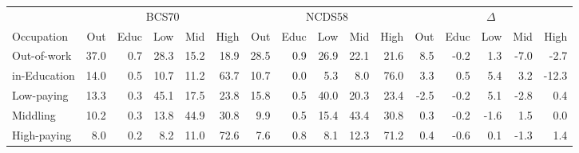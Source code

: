 
\begin{tabular}{lrrrrrrrrrrrrrrr}
\toprule
\multicolumn{1}{c}{} & \multicolumn{5}{c}{BCS70} & \multicolumn{5}{c}{NCDS58} & \multicolumn{5}{c}{$\Delta$} \\
\cmidrule(l{3pt}r{3pt}){2-6} \cmidrule(l{3pt}r{3pt}){7-11} \cmidrule(l{3pt}r{3pt}){12-16}
Occupation & Out & Educ & Low & Mid & High & Out & Educ & Low & Mid & High & Out & Educ & Low & Mid & High\\
\midrule
Out-of-work & 37.0 & 0.7 & 28.3 & 15.2 & 18.9 & 28.5 & 0.9 & 26.9 & 22.1 & 21.6 & 8.5 & -0.2 & 1.3 & -7.0 & -2.7\\
in-Education & 14.0 & 0.5 & 10.7 & 11.2 & 63.7 & 10.7 & 0.0 & 5.3 & 8.0 & 76.0 & 3.3 & 0.5 & 5.4 & 3.2 & -12.3\\
Low-paying & 13.3 & 0.3 & 45.1 & 17.5 & 23.8 & 15.8 & 0.5 & 40.0 & 20.3 & 23.4 & -2.5 & -0.2 & 5.1 & -2.8 & 0.4\\
Middling & 10.2 & 0.3 & 13.8 & 44.9 & 30.8 & 9.9 & 0.5 & 15.4 & 43.4 & 30.8 & 0.3 & -0.2 & -1.6 & 1.5 & 0.0\\
High-paying & 8.0 & 0.2 & 8.2 & 11.0 & 72.6 & 7.6 & 0.8 & 8.1 & 12.3 & 71.2 & 0.4 & -0.6 & 0.1 & -1.3 & 1.4\\
\bottomrule
\end{tabular}
